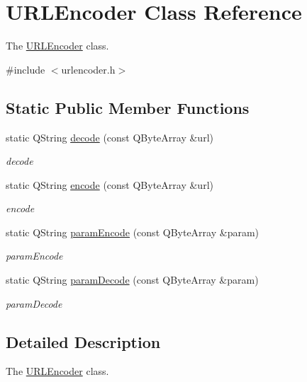 \hypertarget{class_u_r_l_encoder}{}\section{U\+R\+L\+Encoder Class Reference}
\label{class_u_r_l_encoder}


The \mbox{\hyperlink{class_u_r_l_encoder}{U\+R\+L\+Encoder}} class.  




{\ttfamily \#include $<$urlencoder.\+h$>$}

\subsection*{Static Public Member Functions}
\begin{DoxyCompactItemize}
\item 
static Q\+String \mbox{\hyperlink{class_u_r_l_encoder_a109e17d4d839a70b56125c239918b639}{decode}} (const Q\+Byte\+Array \&url)
\begin{DoxyCompactList}\small\item\em decode \end{DoxyCompactList}\item 
static Q\+String \mbox{\hyperlink{class_u_r_l_encoder_ad30f9c19d4629f268d54983d891db714}{encode}} (const Q\+Byte\+Array \&url)
\begin{DoxyCompactList}\small\item\em encode \end{DoxyCompactList}\item 
static Q\+String \mbox{\hyperlink{class_u_r_l_encoder_a1621d8a57c2fd83dabce790a8eeef976}{param\+Encode}} (const Q\+Byte\+Array \&param)
\begin{DoxyCompactList}\small\item\em param\+Encode \end{DoxyCompactList}\item 
static Q\+String \mbox{\hyperlink{class_u_r_l_encoder_a8780e1a9f6186726c83776a5c3543b6e}{param\+Decode}} (const Q\+Byte\+Array \&param)
\begin{DoxyCompactList}\small\item\em param\+Decode \end{DoxyCompactList}\end{DoxyCompactItemize}


\subsection{Detailed Description}
The \mbox{\hyperlink{class_u_r_l_encoder}{U\+R\+L\+Encoder}} class. 

